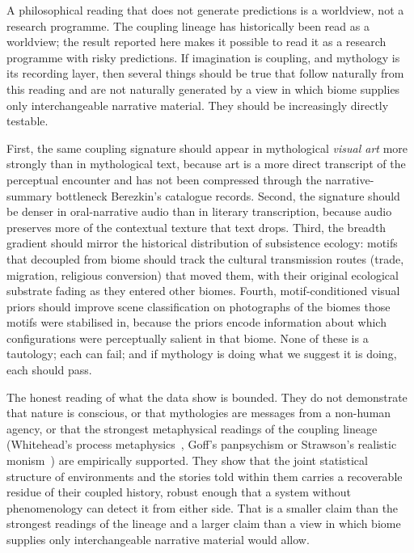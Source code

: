 \documentclass[11pt,a4paper]{article}
\begin{document}
A philosophical reading that does not generate predictions is a
worldview, not a research programme. The coupling lineage has
historically been read as a worldview; the result reported here
makes it possible to read it as a research programme with risky
predictions. If imagination is coupling, and mythology is its
recording layer, then several things should be true that follow
naturally from this reading and are not naturally generated by a
view in which biome supplies only interchangeable narrative
material. They should be increasingly directly testable.

First, the same coupling signature should appear in
mythological \emph{visual art} more strongly than in
mythological text, because art is a more direct transcript of
the perceptual encounter and has not been compressed through the
narrative-summary bottleneck Berezkin's catalogue records.
Second, the signature
should be denser in oral-narrative audio than in literary
transcription, because audio preserves more of the contextual
texture that text drops. Third, the breadth gradient should
mirror the historical distribution of subsistence ecology:
motifs that decoupled from biome should track the cultural
transmission routes (trade, migration, religious conversion) that
moved them, with their original ecological substrate fading as
they entered other biomes. Fourth, motif-conditioned visual
priors should improve scene classification on photographs of the
biomes those motifs were stabilised in, because the priors
encode information about which configurations were perceptually
salient in that biome. None of these is a tautology; each can
fail; and if mythology is doing what we suggest it is doing,
each should pass.

The honest reading of what the data show is bounded. They do not
demonstrate that nature is conscious, or that mythologies are
messages from a non-human agency, or that the strongest
metaphysical readings of the coupling lineage (Whitehead's
process metaphysics~\citep{whitehead1929process}, Goff's
panpsychism or Strawson's realistic
monism~\citep{goff2019galileo,strawson2006realistic}) are
empirically supported. They show that the joint statistical
structure of environments and the stories told within them
carries a recoverable residue of their coupled history, robust
enough that a system without phenomenology can detect it from
either side. That is a smaller claim than the strongest readings
of the lineage and a larger claim than a view in which biome
supplies only interchangeable narrative material would allow.
\end{document}
